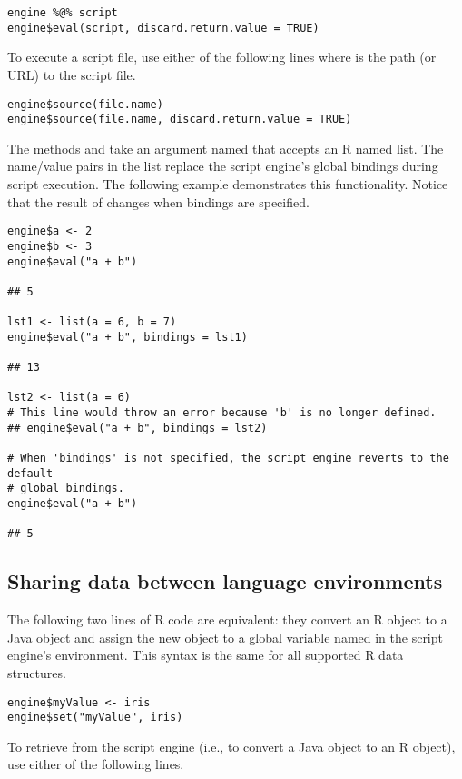\begin{verbatim}
engine %@% script
engine$eval(script, discard.return.value = TRUE)
\end{verbatim}
To execute a script file, use either of the following lines where  is the path (or URL) to the script file.

\begin{verbatim}
engine$source(file.name)
engine$source(file.name, discard.return.value = TRUE)
\end{verbatim}

The methods  and  take an argument named  that accepts an R named list. The name/value pairs in the list replace the script engine's global bindings during script execution. The following example demonstrates this functionality. Notice that the result of  changes when bindings are specified.

\begin{verbatim}
engine$a <- 2
engine$b <- 3
engine$eval("a + b")

## 5

lst1 <- list(a = 6, b = 7)
engine$eval("a + b", bindings = lst1)

## 13

lst2 <- list(a = 6)
# This line would throw an error because 'b' is no longer defined.
## engine$eval("a + b", bindings = lst2)

# When 'bindings' is not specified, the script engine reverts to the default
# global bindings.
engine$eval("a + b")

## 5
\end{verbatim}

\subsection{Sharing data between language environments}

The following two lines of R code are equivalent: they convert an R object to a Java object and assign the new object to a global variable named  in the script engine's environment. This syntax is the same for all supported R data structures.

\begin{verbatim}
engine$myValue <- iris
engine$set("myValue", iris)
\end{verbatim}

To retrieve  from the script engine (i.e., to convert a Java object to an R object), use either of the following lines.

